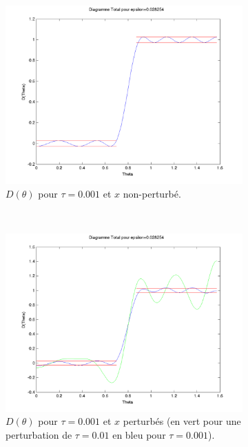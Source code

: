 \begin{figure}[h!]
  \begin{subfigure}[b]{0.45\textwidth}
  \includegraphics[width=\textwidth]{D-ModRobust1-001.png}
  \caption{$D(\theta)$ pour $\tau = 0.001$ et $x$ non-perturbé.}
  \label{fig:D-ModRobust1-001}
  \end{subfigure}%
  ~ 
  \begin{subfigure}[b]{0.45\textwidth}
  \includegraphics[width=\textwidth]{D-ModRobust1-testRob001.png}
  \caption{$D(\theta)$ pour $\tau = 0.001$ et $x$ perturbés (en vert pour une perturbation de $\tau=0.01$ en bleu pour $\tau=0.001$).}
  \label{fig:D-ModRobust1-testRob001}
  \end{subfigure}
  \caption{}
  \end{figure}
